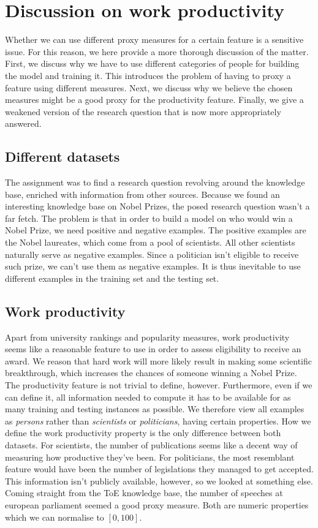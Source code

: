 \section{Discussion on work productivity}
\label{sec:productivity}

Whether we can use different proxy measures for a certain feature is a sensitive issue. For this reason, we here provide a more thorough discussion of the matter. First, we discuss why we have to use different categories of people for building the model and training it. This introduces the problem of having to proxy a feature using  different measures. Next, we discuss why we believe the chosen measures might be a good proxy for the productivity feature. Finally, we give a weakened version of the research question that is now more appropriately answered.

\subsection{Different datasets}

The assignment was to find a research question revolving around the knowledge base, enriched with information from other sources. Because we found an interesting knowledge base on Nobel Prizes, the posed research question wasn't a far fetch. The problem is that in order to build a model on who would win a Nobel Prize, we need positive and negative examples. The positive examples are the Nobel laureates, which come from a pool of scientists. All other scientists naturally serve as negative examples. Since a politician isn't eligible to receive such prize, we can't use them as negative examples. It is thus inevitable to use different examples in the training set and the testing set.

\subsection{Work productivity}

Apart from university rankings and popularity measures, work productivity seems like a reasonable feature to use in order to assess eligibility to receive an award. We reason that hard work will more likely result in making some scientific breakthrough, which increases the chances of someone winning a Nobel Prize. The productivity feature is not trivial to define, however. Furthermore, even if we can define it, all information needed to compute it has to be available for as many training and testing instances as possible. We therefore view all examples as \emph{persons} rather than \emph{scientists} or \emph{politicians}, having certain properties. How we define the work productivity property is the only difference between both datasets. For scientists, the number of publications seems like a decent way of measuring how productive they've been. For politicians, the most resemblant feature would have been the number of legislations they managed to get accepted. This information isn't publicly available, however, so we looked at something else. Coming straight from the ToE knowledge base, the number of speeches at european parliament seemed a good proxy measure. Both are numeric properties which we can normalise to $[0, 100]$.

